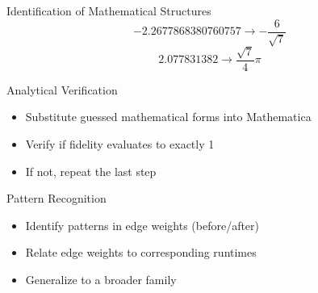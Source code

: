 \documentclass{beamer}
\begin{document}
\begin{frame}{Identification of Mathematical Structures}
    \begin{displaymath}
        -2.2677868380760757\rightarrow-\frac{6}{\sqrt{7}}
    \end{displaymath}
    \begin{displaymath}
        2.077831382\rightarrow\frac{\sqrt{7}}{4}\pi
    \end{displaymath}
\end{frame}
\begin{frame}{Analytical Verification}
    \begin{itemize}
        \item Substitute guessed mathematical forms into Mathematica
        \item Verify if fidelity evaluates to exactly 1
        \item If not, repeat the last step
    \end{itemize}
\end{frame}
\begin{frame}{Pattern Recognition}
    \begin{itemize}
        \item Identify patterns in edge weights (before/after)
        \item Relate edge weights to corresponding runtimes
        \item Generalize to a broader family
    \end{itemize}
\end{frame}
\end{document}
